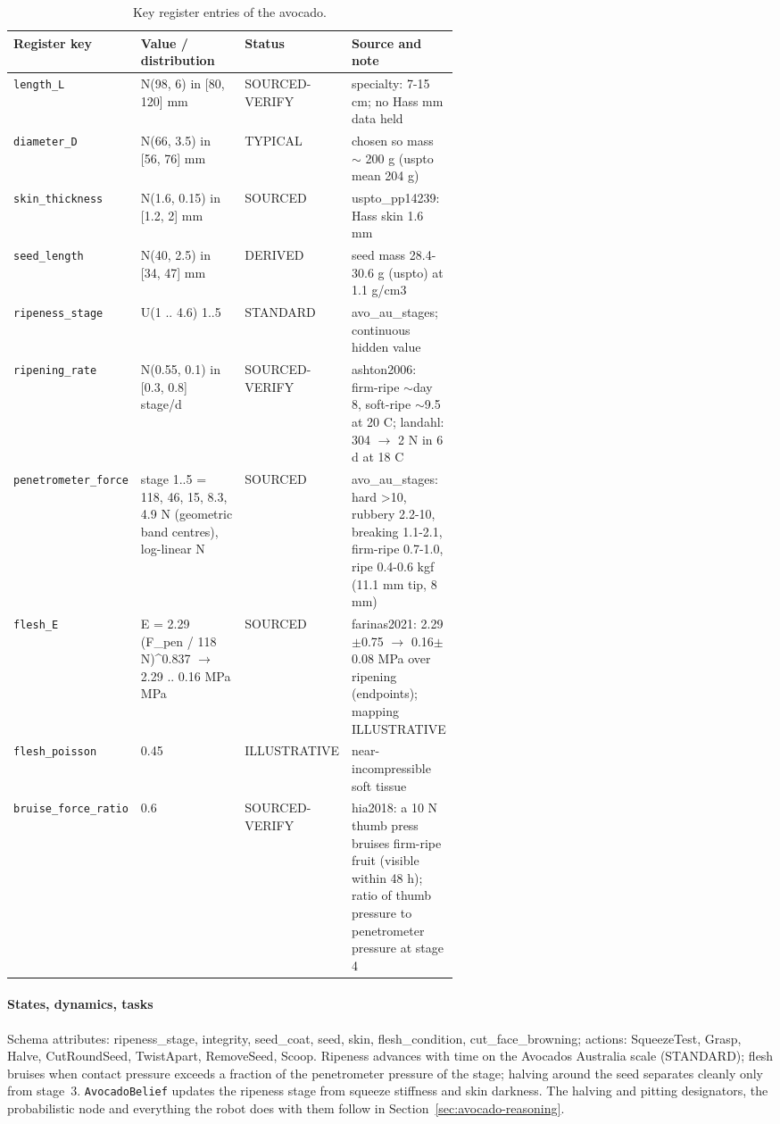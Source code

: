 \documentclass[10.5pt,a4paper]{article}
\begin{document}
\begin{table}[htbp]\centering\scriptsize\caption{Key register entries of the avocado.}
\begin{tabularx}{\linewidth}{@{}p{0.19\linewidth}p{0.27\linewidth}p{0.12\linewidth}X@{}}\toprule Register key & Value / distribution & Status & Source and note \\\midrule
\texttt{length\_\allowbreak{}L} & N(98, 6) in [80, 120] mm & SOURCED-VERIFY & specialty: 7-15 cm; no Hass mm data held \\
\texttt{diameter\_\allowbreak{}D} & N(66, 3.5) in [56, 76] mm & TYPICAL & chosen so mass $\sim$ 200 g (uspto mean 204 g) \\
\texttt{skin\_\allowbreak{}thickness} & N(1.6, 0.15) in [1.2, 2] mm & SOURCED & uspto\_pp14239: Hass skin 1.6 mm \\
\texttt{seed\_\allowbreak{}length} & N(40, 2.5) in [34, 47] mm & DERIVED & seed mass 28.4-30.6 g (uspto) at 1.1 g/cm3 \\
\texttt{ripeness\_\allowbreak{}stage} & U(1 .. 4.6) 1..5 & STANDARD & avo\_au\_stages; continuous hidden value \\
\texttt{ripening\_\allowbreak{}rate} & N(0.55, 0.1) in [0.3, 0.8] stage/d & SOURCED-VERIFY & ashton2006: firm-ripe $\sim$day 8, soft-ripe $\sim$9.5 at 20 C; landahl: 304 $\to$ 2 N in 6 d at 18 C \\
\texttt{penetrometer\_\allowbreak{}force} & stage 1..5 = 118, 46, 15, 8.3, 4.9 N (geometric band centres), log-linear N & SOURCED & avo\_au\_stages: hard >10, rubbery 2.2-10, breaking 1.1-2.1, firm-ripe 0.7-1.0, ripe 0.4-0.6 kgf (11.1 mm tip, 8 mm) \\
\texttt{flesh\_\allowbreak{}E} & E = 2.29 (F\_pen / 118 N)\^{}0.837 $\to$ 2.29 .. 0.16 MPa MPa & SOURCED & farinas2021: 2.29$\pm$0.75 $\to$ 0.16$\pm$0.08 MPa over ripening (endpoints); mapping ILLUSTRATIVE \\
\texttt{flesh\_\allowbreak{}poisson} & 0.45 & ILLUSTRATIVE & near-incompressible soft tissue \\
\texttt{bruise\_\allowbreak{}force\_\allowbreak{}ratio} & 0.6 & SOURCED-VERIFY & hia2018: a 10 N thumb press bruises firm-ripe fruit (visible within 48 h); ratio of thumb pressure to penetrometer pressure at stage 4 \\\bottomrule\end{tabularx}\end{table}
\paragraph{States, dynamics, tasks} Schema attributes: ripeness\_stage, integrity, seed\_coat, seed, skin, flesh\_condition, cut\_face\_browning; actions: SqueezeTest, Grasp, Halve, CutRoundSeed, TwistApart, RemoveSeed, Scoop. Ripeness advances with time on the Avocados Australia scale
(STANDARD); flesh bruises when contact pressure exceeds a fraction of the penetrometer pressure of the stage; halving
around the seed separates cleanly only from stage~3. \texttt{AvocadoBelief} updates the ripeness stage from squeeze
stiffness and skin darkness. The halving and pitting designators, the probabilistic node and everything the robot
does with them follow in Section~\ref{sec:avocado-reasoning}.
\end{document}

